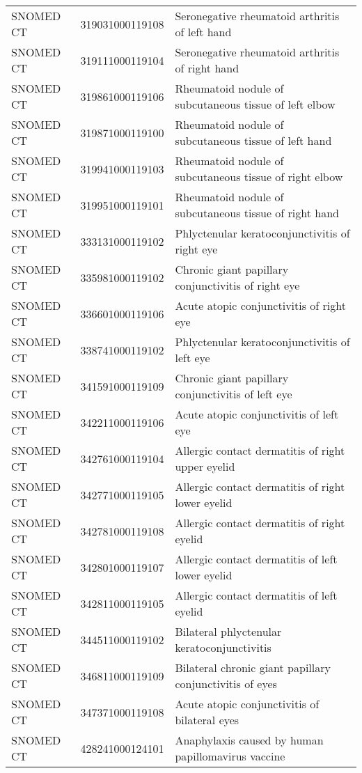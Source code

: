 \begin{longtable}{p{}p{}p{}}
  SNOMED CT & 319031000119108 & Seronegative rheumatoid arthritis of left hand \\ 
  SNOMED CT & 319111000119104 & Seronegative rheumatoid arthritis of right hand \\ 
  SNOMED CT & 319861000119106 & Rheumatoid nodule of subcutaneous tissue of left elbow \\ 
  SNOMED CT & 319871000119100 & Rheumatoid nodule of subcutaneous tissue of left hand \\ 
  SNOMED CT & 319941000119103 & Rheumatoid nodule of subcutaneous tissue of right elbow \\ 
  SNOMED CT & 319951000119101 & Rheumatoid nodule of subcutaneous tissue of right hand \\ 
  SNOMED CT & 333131000119102 & Phlyctenular keratoconjunctivitis of right eye \\ 
  SNOMED CT & 335981000119102 & Chronic giant papillary conjunctivitis of right eye \\ 
  SNOMED CT & 336601000119106 & Acute atopic conjunctivitis of right eye \\ 
  SNOMED CT & 338741000119102 & Phlyctenular keratoconjunctivitis of left eye \\ 
  SNOMED CT & 341591000119109 & Chronic giant papillary conjunctivitis of left eye \\ 
  SNOMED CT & 342211000119106 & Acute atopic conjunctivitis of left eye \\ 
  SNOMED CT & 342761000119104 & Allergic contact dermatitis of right upper eyelid \\ 
  SNOMED CT & 342771000119105 & Allergic contact dermatitis of right lower eyelid \\ 
  SNOMED CT & 342781000119108 & Allergic contact dermatitis of right eyelid \\ 
  SNOMED CT & 342801000119107 & Allergic contact dermatitis of left lower eyelid \\ 
  SNOMED CT & 342811000119105 & Allergic contact dermatitis of left eyelid \\ 
  SNOMED CT & 344511000119102 & Bilateral phlyctenular keratoconjunctivitis \\ 
  SNOMED CT & 346811000119109 & Bilateral chronic giant papillary conjunctivitis of eyes \\ 
  SNOMED CT & 347371000119108 & Acute atopic conjunctivitis of bilateral eyes \\ 
  SNOMED CT & 428241000124101 & Anaphylaxis caused by human papillomavirus vaccine \\ 

\end{longtable}
